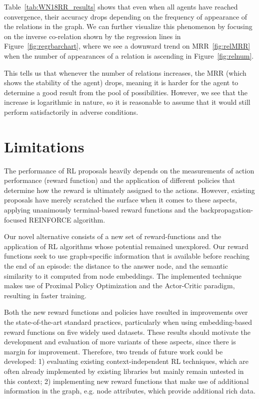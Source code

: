 Table~\ref{tab:WN18RR_results} shows that even when all agents have reached convergence, their accuracy drops depending on the frequency of appearance of the relations in the graph. We can further visualize this phenomenon by focusing on the inverse co-relation shown by the regression lines in Figure~\ref{fig:regrbarchart}, where we see a downward trend on MRR~\ref{fig:relMRR} when the number of appearances of a relation is ascending in Figure~\ref{fig:relnum}.

This tells us that whenever the number of relations increases, the MRR (which shows the stability of the agent) drops, meaning it is harder for the agent to determine a good result from the pool of possibilities. However, we see that the increase is logarithmic in nature, so it is reasonable to assume that it would still perform satisfactorily in adverse conditions.

\section{Limitations}\label{sec:spacerl-limitations}


The performance of RL proposals heavily depends on the measurements of action performance (reward function) and the application of different policies that determine how the reward is ultimately assigned to the actions. However, existing proposals have merely scratched the surface when it comes to these aspects, applying unanimously terminal-based reward functions and the backpropagation-focused REINFORCE algorithm.

Our novel alternative consists of a new set of reward-functions and the application of RL algorithms whose potential remained unexplored. Our reward functions seek to use graph-specific information that is available before reaching the end of an episode: the distance to the answer node, and the semantic similarity to it computed from node embeddings. The implemented technique makes use of Proximal Policy Optimization and the Actor-Critic paradigm, resulting in faster training.

Both the new reward functions and policies have resulted in improvements over the state-of-the-art standard practices, particularly when using embedding-based reward functions on five widely used datasets. These results should motivate the development and evaluation of more variants of these aspects, since there is margin for improvement. Therefore, two trends of future work could be developed: 1) evaluating existing context-independent RL techniques, which are often already implemented by existing libraries but mainly remain untested in this context; 2) implementing new reward functions that make use of additional information in the graph, e.g. node attributes, which provide additional rich data.

